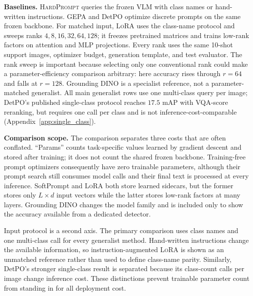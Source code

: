 \documentclass{article}
\newcommand{\lora}{\textsc{LoRA}}
\newcommand{\hard}{\textsc{HardPrompt}}
\begin{document}
\textbf{Baselines.}
\hard{} queries the frozen VLM with class names or hand-written instructions.
GEPA and DetPO optimize discrete prompts on the same frozen backbone.
For matched input, \lora{} uses the class-name protocol and sweeps ranks
$4,8,16,32,64,128$; it freezes pretrained matrices and trains low-rank factors
on attention and MLP projections.
Every rank uses the same 10-shot support images, optimizer budget, generation
template, and test evaluator. The rank sweep is important because selecting
only one conventional rank could make a parameter-efficiency comparison
arbitrary: here accuracy rises through $r=64$ and falls at $r=128$.
Grounding DINO is a specialist reference, not a parameter-matched generalist.
All main generalist rows use one multi-class query per image; DetPO's
published single-class protocol reaches $17.5$ mAP with VQA-score reranking,
but requires one call per class and is not inference-cost-comparable
(Appendix~\ref{app:single_class}).

\textbf{Comparison scope.}
The comparison separates three costs that are often conflated. ``Params''
counts task-specific values learned by gradient descent and stored after
training; it does not count the shared frozen backbone. Training-free prompt
optimizers consequently have zero trainable parameters, although their prompt
search still consumes model calls and their final text is processed at every
inference. SoftPrompt and \lora{} both store learned sidecars, but the former
stores only $L\times d$ input vectors while the latter stores low-rank factors
at many layers. Grounding DINO changes the model family and is included only to
show the accuracy available from a dedicated detector.

Input protocol is a second axis. The primary comparison uses class names and
one multi-class call for every generalist method. Hand-written instructions
change the available information, so instruction-augmented \lora{} is shown as
an unmatched reference rather than used to define class-name parity. Similarly,
DetPO's stronger single-class result is separated because its class-count
calls per image change inference cost. These distinctions prevent trainable
parameter count from standing in for all deployment cost.
\end{document}
